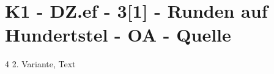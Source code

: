 \section{K1 - DZ.ef - 3[1] - Runden auf Hundertstel - OA - Quelle}

\begin{langesbeispiel}\item[4] %
2. Variante, Text

\end{langesbeispiel}